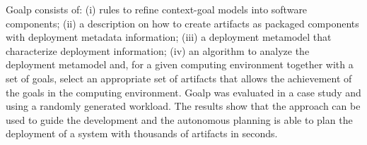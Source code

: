 Goalp consists of: (i) rules to refine context-goal models into software components; (ii) a description on how to create artifacts as packaged components with deployment metadata information; (iii) a deployment metamodel that characterize deployment information; (iv) an algorithm to analyze the deployment metamodel and, for a given computing environment together with a set of goals, select an appropriate set of artifacts that allows the achievement of the goals in the computing environment.
Goalp was evaluated in a case study and using a randomly generated workload. The results show that the approach can be used to guide the development and the autonomous planning is able to plan the deployment of a system with thousands of artifacts in seconds.





